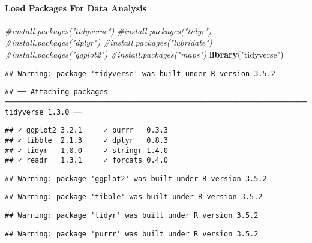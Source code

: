\documentclass[]{article}
\newenvironment{Shaded}{\begin{snugshade}}{\end{snugshade}}
\newcommand{\CommentTok}[1]{\textcolor[rgb]{0.56,0.35,0.01}{\textit{#1}}}
\newcommand{\KeywordTok}[1]{\textcolor[rgb]{0.13,0.29,0.53}{\textbf{#1}}}
\newcommand{\NormalTok}[1]{#1}
\newcommand{\StringTok}[1]{\textcolor[rgb]{0.31,0.60,0.02}{#1}}
\let\oldparagraph\paragraph
\renewcommand{\paragraph}[1]{\oldparagraph{#1}\mbox{}}
\begin{document}
\hypertarget{load-packages-for-data-analysis}{%
\paragraph{\texorpdfstring{\textbf{Load Packages For Data
Analysis}}{Load Packages For Data Analysis}}\label{load-packages-for-data-analysis}}

\begin{Shaded}
\begin{Highlighting}[]
\CommentTok{#install.packages("tidyverse")}
\CommentTok{#install.packages("tidyr")}
\CommentTok{#install.packages("dplyr")}
\CommentTok{#install.packages("lubridate")}
\CommentTok{#install.packages("ggplot2")}
\CommentTok{#install.packages("maps")}
\KeywordTok{library}\NormalTok{(}\StringTok{"tidyverse"}\NormalTok{)}
\end{Highlighting}
\end{Shaded}

\begin{verbatim}
## Warning: package 'tidyverse' was built under R version 3.5.2
\end{verbatim}

\begin{verbatim}
## ── Attaching packages ──────────────────────────────────────────────────────────────────────────── tidyverse 1.3.0 ──
\end{verbatim}

\begin{verbatim}
## ✓ ggplot2 3.2.1     ✓ purrr   0.3.3
## ✓ tibble  2.1.3     ✓ dplyr   0.8.3
## ✓ tidyr   1.0.0     ✓ stringr 1.4.0
## ✓ readr   1.3.1     ✓ forcats 0.4.0
\end{verbatim}

\begin{verbatim}
## Warning: package 'ggplot2' was built under R version 3.5.2
\end{verbatim}

\begin{verbatim}
## Warning: package 'tibble' was built under R version 3.5.2
\end{verbatim}

\begin{verbatim}
## Warning: package 'tidyr' was built under R version 3.5.2
\end{verbatim}

\begin{verbatim}
## Warning: package 'purrr' was built under R version 3.5.2
\end{verbatim}
\end{document}
